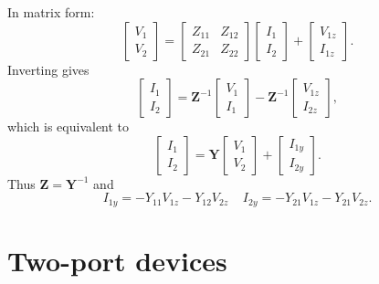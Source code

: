 \documentclass[a4paper, 12pt]{article}
\newcommand{\mat}[1]{\mathbf{#1}}
\newcommand{\bigspace}{\;\;\;\;}
\begin{document}
In matrix form:
%
\begin{equation}
  \begin{bmatrix}
    V_1 \\ V_2
  \end{bmatrix}
  =
  \begin{bmatrix}
    Z_{11} & Z_{12} \\
    Z_{21} & Z_{22}
  \end{bmatrix}
  \begin{bmatrix}
    I_1 \\ I_2
  \end{bmatrix}
  +
  \begin{bmatrix}
    V_{1z} \\ I_{1z}
  \end{bmatrix}.
\end{equation}
%
Inverting gives
%
\begin{equation}
  \begin{bmatrix}
    I_1 \\ I_2
  \end{bmatrix}
  =
  \mat{Z}^{-1}
  \begin{bmatrix}
    V_1 \\ I_1
  \end{bmatrix}
  -
  \mat{Z}^{-1}
  \begin{bmatrix}
    V_{1z} \\ I_{2z}
  \end{bmatrix},
\end{equation}
%
which is equivalent to
%
\begin{equation}
  \begin{bmatrix}
    I_1 \\ I_2
  \end{bmatrix}
  =
  \mat{Y}
  \begin{bmatrix}
    V_1 \\ V_2
  \end{bmatrix}
  +
  \begin{bmatrix}
    I_{1y} \\ I_{2y}
  \end{bmatrix}.
\end{equation}
%
Thus $\mat{Z} = \mat{Y}^{-1}$ and
%
\begin{equation}
I_{1y} = -Y_{11} V_{1z} - Y_{12} V_{2z} \bigspace I_{2y} = -Y_{21} V_{1z} - Y_{21} V_{2z}.
\end{equation}


\section{Two-port devices}
\end{document}

